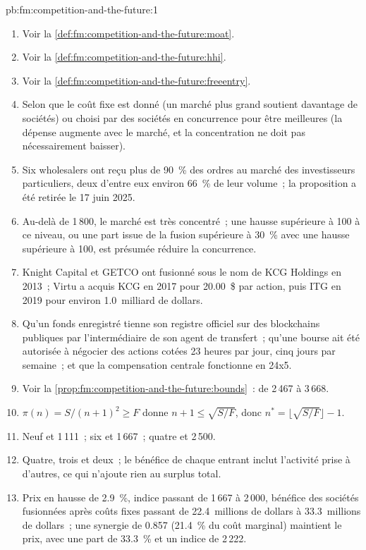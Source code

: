 \begin{solution}{pb:fm:competition-and-the-future:1}
\begin{enumerate}
\item Voir la \cref{def:fm:competition-and-the-future:moat}.
\item Voir la \cref{def:fm:competition-and-the-future:hhi}.
\item Voir la \cref{def:fm:competition-and-the-future:freeentry}.
\item Selon que le coût fixe est donné (un marché plus grand soutient davantage de sociétés) ou choisi par des sociétés en concurrence pour être meilleures (la dépense augmente avec le
marché, et la concentration ne doit pas nécessairement baisser).
\item Six wholesalers ont reçu plus de 90~\% des ordres au marché des investisseurs particuliers, deux d'entre eux environ 66~\% de leur volume~; la proposition a
été retirée le 17 juin 2025.
\item Au-delà de 1\,800, le marché est très concentré~; une hausse supérieure à 100 à ce niveau, ou une part issue de la fusion supérieure à 30~\% avec une hausse supérieure à 100, est présumée réduire la
concurrence.
\item Knight Capital et GETCO ont fusionné sous le nom de KCG Holdings en 2013~; Virtu a acquis KCG en 2017 pour 20.00~\$ par action, puis ITG en 2019 pour environ 1.0~milliard de dollars.
\item Qu'un fonds enregistré tienne son registre officiel sur des blockchains publiques par l'intermédiaire de son agent de transfert~; qu'une bourse ait été autorisée à
négocier des actions cotées 23 heures par jour, cinq jours par semaine~; et que la compensation centrale fonctionne en 24x5.
\item Voir la \cref{prop:fm:competition-and-the-future:bounds}~: de 2\,467 à 3\,668.
\item $\pi(n)=S/(n+1)^2\ge F$ donne $n+1\le\sqrt{S/F}$, donc $n^*=\lfloor\sqrt{S/F}\rfloor-1$.
\item Neuf et 1\,111~; six et 1\,667~; quatre et 2\,500.
\item Quatre, trois et deux~; le bénéfice de chaque entrant inclut l'activité prise à d'autres, ce qui n'ajoute rien au surplus total.
\item Prix en hausse de 2.9~\%, indice passant de 1\,667 à 2\,000, bénéfice des sociétés fusionnées après coûts fixes passant de 22.4~millions de dollars à 33.3~millions de dollars~; une synergie de 0.857
(21.4~\% du coût marginal) maintient le prix, avec une part de 33.3~\% et un indice de 2\,222.

\end{enumerate}
\end{solution}
